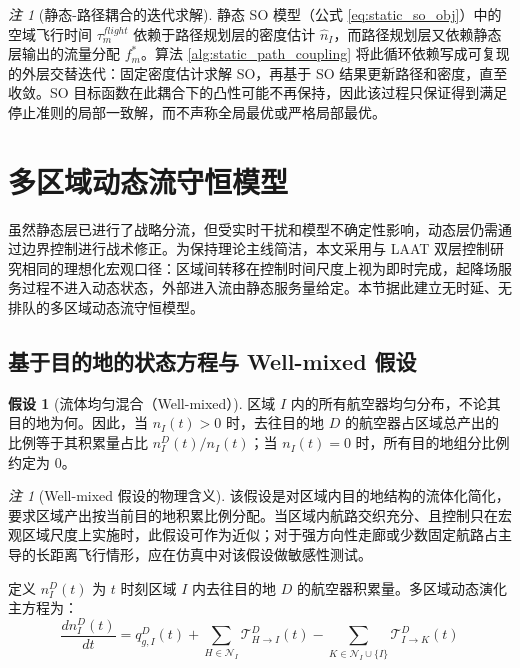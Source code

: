 \documentclass[a4paper,12pt]{article}
\theoremstyle{plain}
\theoremstyle{definition}
\newtheorem{assumption}[theorem]{假设}
\theoremstyle{remark}
\newtheorem{remark}[theorem]{注}
\begin{document}
\begin{remark}[静态-路径耦合的迭代求解]\label{rem:static_path_coupling}
静态 SO 模型（公式 \ref{eq:static_so_obj}）中的空域飞行时间 $\tau_m^{flight}$ 依赖于路径规划层的密度估计 $\hat{n}_I$，而路径规划层又依赖静态层输出的流量分配 $f_m^*$。算法 \ref{alg:static_path_coupling} 将此循环依赖写成可复现的外层交替迭代：固定密度估计求解 SO，再基于 SO 结果更新路径和密度，直至收敛。SO 目标函数在此耦合下的凸性可能不再保持，因此该过程只保证得到满足停止准则的局部一致解，而不声称全局最优或严格局部最优。
\end{remark}

\section{多区域动态流守恒模型}

虽然静态层已进行了战略分流，但受实时干扰和模型不确定性影响，动态层仍需通过边界控制进行战术修正。为保持理论主线简洁，本文采用与 LAAT 双层控制研究相同的理想化宏观口径：区域间转移在控制时间尺度上视为即时完成，起降场服务过程不进入动态状态，外部进入流由静态服务量给定。本节据此建立无时延、无排队的多区域动态流守恒模型。

\subsection{基于目的地的状态方程与 Well-mixed 假设}

\begin{assumption}[流体均匀混合（Well-mixed）]\label{asm:well_mixed}
区域 $I$ 内的所有航空器均匀分布，不论其目的地为何。因此，当 $n_I(t)>0$ 时，去往目的地 $D$ 的航空器占区域总产出的比例等于其积累量占比 $n_I^D(t)/n_I(t)$；当 $n_I(t)=0$ 时，所有目的地组分比例约定为 $0$。
\end{assumption}

\begin{remark}[Well-mixed 假设的物理含义]
该假设是对区域内目的地结构的流体化简化，要求区域产出按当前目的地积累比例分配。当区域内航路交织充分、且控制只在宏观区域尺度上实施时，此假设可作为近似；对于强方向性走廊或少数固定航路占主导的长距离飞行情形，应在仿真中对该假设做敏感性测试。
\end{remark}

定义 $n_I^D(t)$ 为 $t$ 时刻区域 $I$ 内去往目的地 $D$ 的航空器积累量。多区域动态演化主方程为：
\begin{equation} \label{eq:dynamic_master}
    \frac{d n_I^D(t)}{dt} = q_{g, I}^D(t) + \sum_{H \in \mathcal{N}_I} \mathcal{T}_{H \to I}^D(t) - \sum_{K \in \mathcal{N}_I \cup \{I\}} \mathcal{T}_{I \to K}^D(t)
\end{equation}
\end{document}

